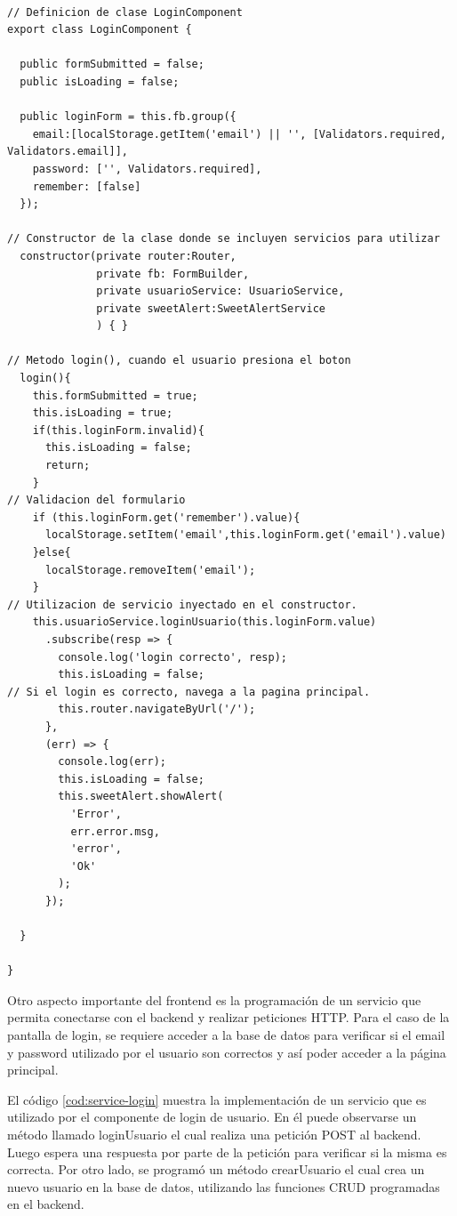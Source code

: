 \begin{lstlisting}[label=cod:ts-login,caption=Fragmentos de código más relevantes utilizado en el archivo \textit{Typescript} del componente login.] 

// Definicion de clase LoginComponent
export class LoginComponent {

  public formSubmitted = false;
  public isLoading = false;

  public loginForm = this.fb.group({  
    email:[localStorage.getItem('email') || '', [Validators.required, Validators.email]],
    password: ['', Validators.required],
    remember: [false]
  });

// Constructor de la clase donde se incluyen servicios para utilizar
  constructor(private router:Router,
              private fb: FormBuilder,
              private usuarioService: UsuarioService,
              private sweetAlert:SweetAlertService
              ) { }
              
// Metodo login(), cuando el usuario presiona el boton
  login(){
    this.formSubmitted = true;
    this.isLoading = true;
    if(this.loginForm.invalid){
      this.isLoading = false;
      return;
    }
// Validacion del formulario 
    if (this.loginForm.get('remember').value){
      localStorage.setItem('email',this.loginForm.get('email').value)
    }else{
      localStorage.removeItem('email');
    }
// Utilizacion de servicio inyectado en el constructor.
    this.usuarioService.loginUsuario(this.loginForm.value)
      .subscribe(resp => {
        console.log('login correcto', resp);
        this.isLoading = false;
// Si el login es correcto, navega a la pagina principal. 
        this.router.navigateByUrl('/');
      },
      (err) => {
        console.log(err);
        this.isLoading = false;
        this.sweetAlert.showAlert(
          'Error',
          err.error.msg,
          'error',
          'Ok'
        );
      });
    
  }

}
\end{lstlisting} 

Otro aspecto importante del frontend es la programación de un servicio que permita conectarse con el backend y realizar peticiones HTTP. Para el caso de la pantalla de login,  se requiere acceder a la base de datos para verificar si el email y password utilizado por el usuario son correctos y así poder acceder a la página principal. 

El código \ref{cod:service-login} muestra la implementación de un servicio que es utilizado por el componente de login de usuario. En él puede observarse un método llamado loginUsuario el cual realiza una petición POST al backend.  Luego espera una respuesta por parte de la petición para verificar si la misma es correcta.  Por otro lado, se programó un método crearUsuario el cual crea un nuevo usuario en la base de datos, utilizando las funciones CRUD programadas en el backend. 

